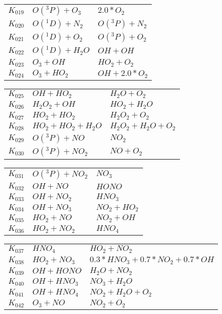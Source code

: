 {\begin{tabular}{l@{\,:\,}p{0.2\chfwidth}@{$\quad\longrightarrow\quad$}p{0.6\chfwidth}}
$K_{019}$ & $O({}^3P)+O_{3}$ & $2.0*O_{2}$ \\
$K_{020}$ & $O({}^1D)+N_{2}$ & $O({}^3P)+N_{2}$ \\
$K_{021}$ & $O({}^1D)+O_{2}$ & $O({}^3P)+O_{2}$ \\
$K_{022}$ & $O({}^1D)+H_{2}O$ & $OH+OH$ \\
$K_{023}$ & $O_{3}+OH$ & $HO_{2}+O_{2}$ \\
$K_{024}$ & $O_{3}+HO_{2}$ & $OH+2.0*O_{2}$ \\
\end{tabular}
 
\begin{tabular}{l@{\,:\,}p{0.2\chfwidth}@{$\quad\longrightarrow\quad$}p{0.6\chfwidth}}
$K_{025}$ & $OH+HO_{2}$ & $H_{2}O+O_{2}$ \\
$K_{026}$ & $H_{2}O_{2}+OH$ & $HO_{2}+H_{2}O$ \\
$K_{027}$ & $HO_{2}+HO_{2}$ & $H_{2}O_{2}+O_{2}$ \\
$K_{028}$ & $HO_{2}+HO_{2}+H_{2}O$ & $H_{2}O_{2}+H_{2}O+O_{2}$ \\
$K_{029}$ & $O({}^3P)+NO$ & $NO_{2}$ \\
$K_{030}$ & $O({}^3P)+NO_{2}$ & $NO+O_{2}$ \\
\end{tabular}
 
\begin{tabular}{l@{\,:\,}p{0.2\chfwidth}@{$\quad\longrightarrow\quad$}p{0.6\chfwidth}}
$K_{031}$ & $O({}^3P)+NO_{2}$ & $NO_{3}$ \\
$K_{032}$ & $OH+NO$ & $HONO$ \\
$K_{033}$ & $OH+NO_{2}$ & $HNO_{3}$ \\
$K_{034}$ & $OH+NO_{3}$ & $NO_{2}+HO_{2}$ \\
$K_{035}$ & $HO_{2}+NO$ & $NO_{2}+OH$ \\
$K_{036}$ & $HO_{2}+NO_{2}$ & $HNO_{4}$ \\
\end{tabular}
 
\begin{tabular}{l@{\,:\,}p{0.2\chfwidth}@{$\quad\longrightarrow\quad$}p{0.6\chfwidth}}
$K_{037}$ & $HNO_{4}$ & $HO_{2}+NO_{2}$ \\
$K_{038}$ & $HO_{2}+NO_{3}$ & $0.3*HNO_{3}+0.7*NO_{2}+0.7*OH$ \\
$K_{039}$ & $OH+HONO$ & $H_{2}O+NO_{2}$ \\
$K_{040}$ & $OH+HNO_{3}$ & $NO_{3}+H_{2}O$ \\
$K_{041}$ & $OH+HNO_{4}$ & $NO_{2}+H_{2}O+O_{2}$ \\
$K_{042}$ & $O_{3}+NO$ & $NO_{2}+O_{2}$ \\
\end{tabular}
 
}
